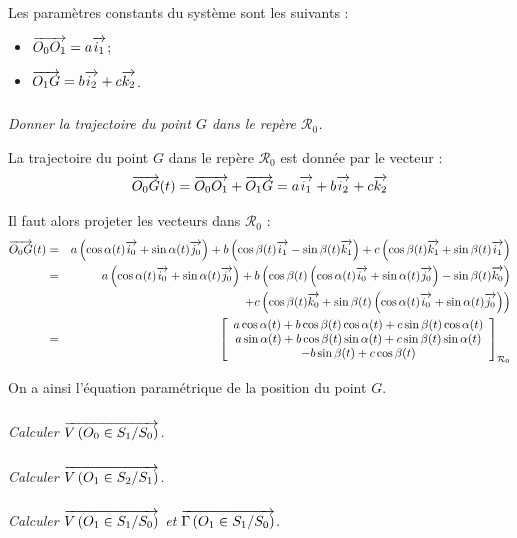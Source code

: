 \documentclass[10pt,fleqn]{article} %
\begin{document}
\begin{multicols}{2}
Les paramètres constants du système sont les suivants : 
\begin{itemize}%
\item $\overrightarrow{O_0O_1} = a \overrightarrow{i_1}$;
\item $\overrightarrow{O_1G} = b \overrightarrow{i_2} + c \overrightarrow{k_2}$.
\end{itemize}





\subparagraph{}
\textit{Donner la trajectoire du point $G$ dans le repère $\mathcal{R}_0$.}
\ifprof
\begin{corrige}
La trajectoire du point $G$ dans le repère $\mathcal{R}_0$  est donnée par le vecteur :
$$
\overrightarrow{O_0 G}(t)  = \overrightarrow{O_0O_1} + \overrightarrow{O_1G}
= a \overrightarrow{i_1} +  b \overrightarrow{i_2} + c \overrightarrow{k_2}
$$

Il faut alors projeter les vecteurs dans $\mathcal{R}_0$ : 
\begin{eqnarray*}
\overrightarrow{O_0 G}(t) &=& a \left(\cos\alpha(t) \overrightarrow{i_0} + \sin\alpha(t) \overrightarrow{j_0} \right) 
+ b \left(\cos\beta(t) \overrightarrow{i_1} - \sin\beta(t) \overrightarrow{k_1} \right) 
+ c\left(\cos\beta(t) \overrightarrow{k_1} + \sin\beta(t)\overrightarrow{i_1}\right)\\
&=& a \left(\cos\alpha(t) \overrightarrow{i_0} + \sin\alpha(t) \overrightarrow{j_0} \right) 
+ b \left(\cos\beta(t) \left(\cos\alpha(t) \overrightarrow{i_0} + \sin\alpha(t) \overrightarrow{j_0} \right) - \sin\beta(t) \overrightarrow{k_0} \right) \\
&& + c\left(\cos\beta(t) \overrightarrow{k_0} + \sin\beta(t)  \left(\cos\alpha(t) \overrightarrow{i_0} + \sin\alpha(t) \overrightarrow{j_0} \right) \right)\\
&=& \left[ \begin{array}{c} 
a \cos\alpha(t) + b \cos\beta(t) \cos\alpha(t) +c \sin\beta(t)\cos\alpha(t)\\
a \sin\alpha(t) + b \cos\beta(t) \sin\alpha(t) +c \sin\beta(t)\sin\alpha(t) \\
- b\sin\beta(t) + c\cos\beta(t)
\end{array}\right]_{\mathcal{R}_0}
\end{eqnarray*}

On a ainsi l'équation paramétrique de la position du point $G$.

\end{corrige}
\else \fi


\subparagraph{}
\textit{Calculer $\overrightarrow{V\left( {O_0} \in {S_1}/{S_0}\right)}$.}

\subparagraph{}
\textit{Calculer $\overrightarrow{V\left( {O_1} \in {S_2}/{S_1}\right)}$.}

\subparagraph{}
\textit{Calculer $\overrightarrow{V\left( {O_1} \in {S_1}/{S_0}\right)}$ et $\overrightarrow{\Gamma \left( {O_1} \in {S_1}/{S_0}\right)}$.}
\ifprof
\begin{corrige}



\end{corrige}
\end{multicols}
\end{document}
